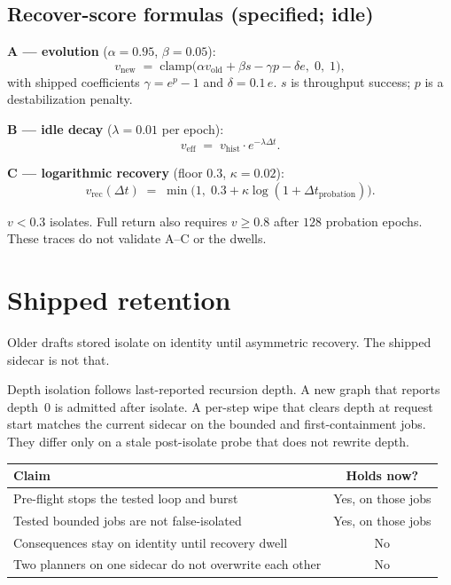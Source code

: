 \documentclass[11pt,a4paper]{article}
\begin{document}
\subsection{Recover-score formulas (specified; idle)}

\textbf{A --- evolution} ($\alpha=0.95$, $\beta=0.05$):
\begin{equation}
v_{\mathrm{new}} \;=\; \mathrm{clamp}\!\bigl(\alpha v_{\mathrm{old}}+\beta s-\gamma p-\delta e,\;0,\;1\bigr),
\end{equation}
with shipped coefficients $\gamma=e^{p}-1$ and $\delta=0.1\,e$.
$s$ is throughput success; $p$ is a destabilization penalty.

\textbf{B --- idle decay} ($\lambda=0.01$ per epoch):
\begin{equation}
v_{\mathrm{eff}} \;=\; v_{\mathrm{hist}}\cdot e^{-\lambda\Delta t}.
\end{equation}

\textbf{C --- logarithmic recovery} (floor $0.3$, $\kappa=0.02$):
\begin{equation}
v_{\mathrm{rec}}(\Delta t) \;=\; \min\!\bigl(1,\; 0.3+\kappa\log(1+\Delta t_{\mathrm{probation}})\bigr).
\end{equation}

$v<0.3$ isolates.
Full return also requires $v\ge 0.8$ after $128$ probation epochs.
These traces do not validate A--C or the dwells.

\section{Shipped retention}

Older drafts stored isolate on identity until asymmetric recovery.
The shipped sidecar is not that.

Depth isolation follows last-reported recursion depth.
A new graph that reports depth~$0$ is admitted after isolate.
A per-step wipe that clears depth at request start matches the current sidecar on the bounded and first-containment jobs.
They differ only on a stale post-isolate probe that does not rewrite depth.

\begin{center}
\small
\begin{tabular}{@{}lc@{}}
\toprule
Claim & Holds now? \\
\midrule
Pre-flight stops the tested loop and burst & Yes, on those jobs \\
Tested bounded jobs are not false-isolated & Yes, on those jobs \\
Consequences stay on identity until recovery dwell & No \\
Two planners on one sidecar do not overwrite each other & No \\
\bottomrule
\end{tabular}
\end{center}
\end{document}
